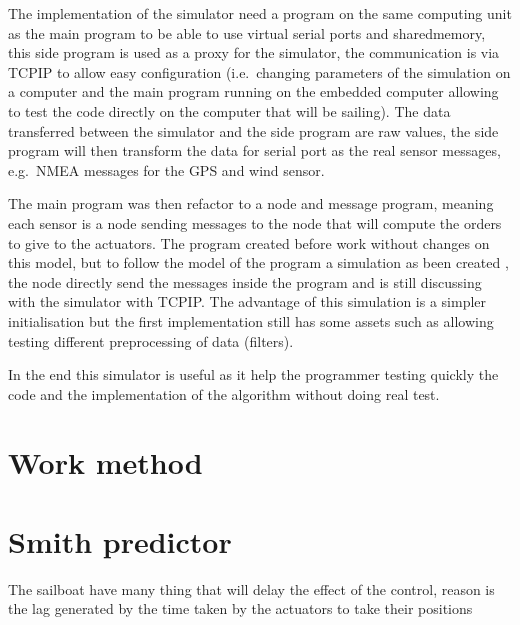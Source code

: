 The implementation of the simulator need a program on the same computing unit as the main program to be able to use virtual serial ports and \gls{sharedmemory}, this side program is used as a proxy for the simulator, the communication is via \gls{TCPIP} to allow easy configuration (i.e.\ changing parameters of the simulation on a computer and the main program running on the embedded computer allowing to test the code directly on the computer that will be sailing).
The data transferred between the simulator and the side program are raw values, the side program will 
then transform the data for serial port as the real sensor messages, e.g.\ \gls{NMEA} messages for the GPS and 
wind sensor.

The main program was then refactor to a node and message program, meaning each sensor is a node sending messages to the node that will compute the orders to give to the actuators. The program created before work without changes on this model, but to follow the model of the program a simulation as been created , the node directly send the messages inside the program and is still discussing with the simulator with \gls{TCPIP}.
The advantage of this simulation is a simpler initialisation but the first implementation still has some assets such as allowing testing different preprocessing of data (filters).

In the end this simulator is useful as it help the programmer testing quickly the code and the implementation of the algorithm without doing real test.


\section{Work method}

\section{Smith predictor}

The sailboat have many thing that will delay the effect of the control,
reason is the lag generated by the time taken by the actuators to take their positions

